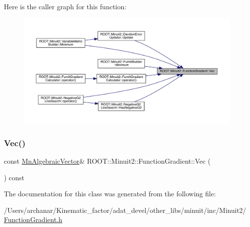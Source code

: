 Here is the caller graph for this function\+:\nopagebreak
\begin{figure}[H]
\begin{center}
\leavevmode
\includegraphics[width=350pt]{d3/d48/classROOT_1_1Minuit2_1_1FunctionGradient_abdf0fd7d9e1a730049112f0c903a9f5f_icgraph}
\end{center}
\end{figure}
\mbox{\label{classROOT_1_1Minuit2_1_1FunctionGradient_abdf0fd7d9e1a730049112f0c903a9f5f}} 
\subsubsection{\texorpdfstring{Vec()}{Vec()}\hspace{0.1cm}{\footnotesize\ttfamily [2/2]}}
{\footnotesize\ttfamily const \mbox{\hyperlink{namespaceROOT_1_1Minuit2_a62ed97730a1ca8d3fbaec64a19aa11c9}{Mn\+Algebraic\+Vector}}\& R\+O\+O\+T\+::\+Minuit2\+::\+Function\+Gradient\+::\+Vec (\begin{DoxyParamCaption}{ }\end{DoxyParamCaption}) const\hspace{0.3cm}{\ttfamily [inline]}}



The documentation for this class was generated from the following file\+:\begin{DoxyCompactItemize}
\item 
/\+Users/archanar/\+Kinematic\+\_\+factor/adat\+\_\+devel/other\+\_\+libs/minuit/inc/\+Minuit2/\mbox{\hyperlink{other__libs_2minuit_2inc_2Minuit2_2FunctionGradient_8h}{Function\+Gradient.\+h}}\end{DoxyCompactItemize}
